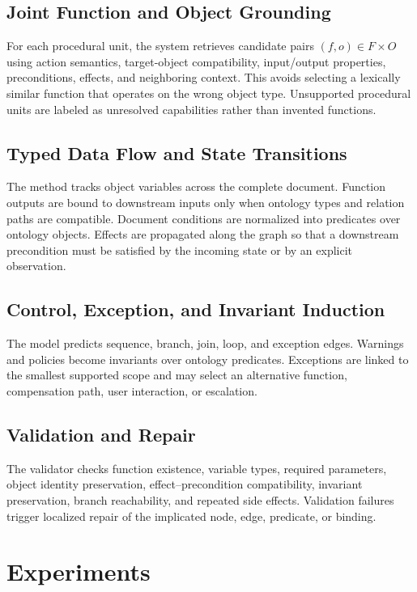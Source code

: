\documentclass[10pt,twocolumn]{article}
\begin{document}
\subsection{Joint Function and Object Grounding}
For each procedural unit, the system retrieves candidate pairs $(f,o)\in F\times O$ using action semantics, target-object compatibility, input/output properties, preconditions, effects, and neighboring context. This avoids selecting a lexically similar function that operates on the wrong object type. Unsupported procedural units are labeled as unresolved capabilities rather than invented functions.

\subsection{Typed Data Flow and State Transitions}
The method tracks object variables across the complete document. Function outputs are bound to downstream inputs only when ontology types and relation paths are compatible. Document conditions are normalized into predicates over ontology objects. Effects are propagated along the graph so that a downstream precondition must be satisfied by the incoming state or by an explicit observation.

\subsection{Control, Exception, and Invariant Induction}
The model predicts sequence, branch, join, loop, and exception edges. Warnings and policies become invariants over ontology predicates. Exceptions are linked to the smallest supported scope and may select an alternative function, compensation path, user interaction, or escalation.

\subsection{Validation and Repair}
The validator checks function existence, variable types, required parameters, object identity preservation, effect--precondition compatibility, invariant preservation, branch reachability, and repeated side effects. Validation failures trigger localized repair of the implicated node, edge, predicate, or binding.

\section{Experiments}
\end{document}
